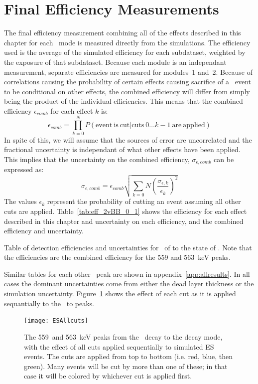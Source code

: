 \documentclass[/main.tex]{subfiles}
\begin{document}
\section{Final Efficiency Measurements}
The final efficiency measurement combining all of the effects described in this chapter for each \bbes\ mode is measured directly from the simulations.
The efficiency used is the average of the simulated efficiency for each subdataset, weighted by the exposure of that subdataset.
Because each module is an independant measurement, separate efficiencies are measured for modules~1 and~2.
Because of correlations causing the probability of certain effects causing sacrifice of a \bbes\ event to be conditional on other effects, the combined efficiency will differ from simply being the product of the individual efficiencies.
This means that the combined efficiency $\epsilon_{comb}$ for each effect $k$ is:
\begin{equation}
  \epsilon_{comb} = \prod_{k=0}^N P(\mathrm{event~is~cut} | \mathrm{cuts~} 0\dots k-1 \mathrm{~are~applied})
\end{equation}
In spite of this, we will assume that the sources of error are uncorrelated and the fractional uncertainty is independant of what other effects have been applied.
This implies that the uncertainty on the combined efficiency, $\sigma_{\epsilon,comb}$ can be expressed as:
\begin{equation}
  \sigma_{\epsilon,comb}=\epsilon_{comb} \sqrt{ \sum_{k=0}{N} (\frac{\sigma_{\epsilon,k}}{\epsilon_k})^2 }
\end{equation}
The values $\epsilon_k$ represent the probability of cutting an event assuming all other cuts are applied.
Table~\ref{tab:eff_2vBB_0_1} shows the efficiency for each effect described in this chapter and uncertainty on each efficiency, and the combined efficiency and uncertainty.
\begin{table}[h]
  \centering
  
  \caption[Detection efficiency summary for \tnbb\ to the  state of ]{\label{tab:eff_2vBB_0_1}
    Table of detection efficiencies and uncertainties for \tnbb\ of  to the  state of . Note that the efficiencies are the combined efficiency for the 559 and 563~keV peaks.
  }
\end{table}
Similar tables for each other \bbes\ peak are shown in appendix~\ref{app:allresults}.
In all cases the dominant uncertainties come from either the dead layer thickness or the simulation uncertainty.
Figure~\ref{fig:escuteffects} shows the effect of each cut as it is applied sequantially to the \tnbb\ to  peaks.
\begin{figure}[htb]
  \centering
  \texttt{[image: ESAllcuts]}
  \caption[Simulated \tnbb to  peaks with cuts applied]{\label{fig:escuteffects}
    The 559~and 563~keV peaks from the \tnbb\ decay to the  decay mode, with the effect of all cuts applied sequentially to simulated ES events. The cuts are applied from top to bottom (i.e. red, blue, then green). Many events will be cut by more than one of these; in that case it will be colored by whichever cut is applied first. 
  }
\end{figure}

\onlyinsubfile{
  
  
}
\end{document}
